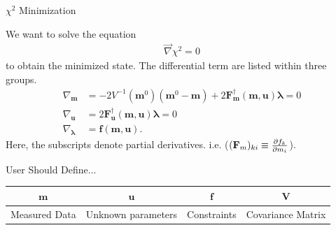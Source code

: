 \documentclass[
	xcolor=dvipsnames,
	aspectratio=169,	
	10pt, 
	]{beamer}
\begin{document}
\begin{frame}{$\chi^2$ Minimization}
	\begin{block}{}
		We want to solve the equation
		\begin{align}
			\vec \nabla \chi^2 =0
		\end{align}
		to obtain the minimized state. The differential term are listed within three groups.
		\begin{align}
			\nabla_{\mathbf m} &= -2 V^{-1}(\mathbf m^0)(\mathbf m^0-\mathbf m) + 2 \mathbf F_\mathbf m^\dagger(\mathbf{m,u})\mathbf\lambda=0\label{GradM}\\
			\nabla_{\mathbf u} &= 2\mathbf F_\mathbf u^\dagger(\mathbf{m,u})\mathbf \lambda =0\label{GradU}\\
			\nabla_{\mathbf \lambda}& = \mathbf f(\mathbf{m,u})\label{GradL}.
		\end{align}
		Here, the subscripts denote partial derivatives. i.e. ($(\mathbf {F}_m)_{ki}\equiv\frac{\partial f_k}{\partial m_i}$).
	\end{block}
	\begin{block}{User Should Define...}
		\begin{table}
			\begin{tabular}{c|c|c|c}
				$\mathbf{m}$&$\mathbf{u}$&$\mathbf{f}$&$\mathbf{V}$\\\hline
				Measured Data&Unknown parameters&Constraints&Covariance Matrix
			\end{tabular}
		\end{table}
	\end{block}
\end{frame}
\end{document}
